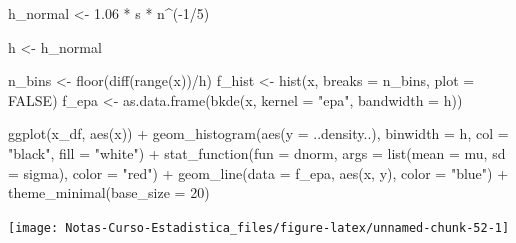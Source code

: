 \documentclass[
  12pt,
]{book}
\newenvironment{Shaded}{\begin{snugshade}}{\end{snugshade}}
\newcommand{\AttributeTok}[1]{\textcolor[rgb]{0.77,0.63,0.00}{#1}}
\newcommand{\ConstantTok}[1]{\textcolor[rgb]{0.00,0.00,0.00}{#1}}
\newcommand{\DecValTok}[1]{\textcolor[rgb]{0.00,0.00,0.81}{#1}}
\newcommand{\FloatTok}[1]{\textcolor[rgb]{0.00,0.00,0.81}{#1}}
\newcommand{\FunctionTok}[1]{\textcolor[rgb]{0.00,0.00,0.00}{#1}}
\newcommand{\NormalTok}[1]{#1}
\newcommand{\OtherTok}[1]{\textcolor[rgb]{0.56,0.35,0.01}{#1}}
\newcommand{\SpecialCharTok}[1]{\textcolor[rgb]{0.00,0.00,0.00}{#1}}
\newcommand{\StringTok}[1]{\textcolor[rgb]{0.31,0.60,0.02}{#1}}
\begin{document}
\begin{Shaded}
\begin{Highlighting}[]
\NormalTok{h\_normal }\OtherTok{\textless{}{-}} \FloatTok{1.06} \SpecialCharTok{*}\NormalTok{ s }\SpecialCharTok{*}\NormalTok{ n}\SpecialCharTok{\^{}}\NormalTok{(}\SpecialCharTok{{-}}\DecValTok{1}\SpecialCharTok{/}\DecValTok{5}\NormalTok{)}

\NormalTok{h }\OtherTok{\textless{}{-}}\NormalTok{ h\_normal}

\NormalTok{n\_bins }\OtherTok{\textless{}{-}} \FunctionTok{floor}\NormalTok{(}\FunctionTok{diff}\NormalTok{(}\FunctionTok{range}\NormalTok{(x))}\SpecialCharTok{/}\NormalTok{h)}
\NormalTok{f\_hist }\OtherTok{\textless{}{-}} \FunctionTok{hist}\NormalTok{(x, }\AttributeTok{breaks =}\NormalTok{ n\_bins, }\AttributeTok{plot =} \ConstantTok{FALSE}\NormalTok{)}
\NormalTok{f\_epa }\OtherTok{\textless{}{-}} \FunctionTok{as.data.frame}\NormalTok{(}\FunctionTok{bkde}\NormalTok{(x, }\AttributeTok{kernel =} \StringTok{"epa"}\NormalTok{, }\AttributeTok{bandwidth =}\NormalTok{ h))}

\FunctionTok{ggplot}\NormalTok{(x\_df, }\FunctionTok{aes}\NormalTok{(x)) }\SpecialCharTok{+} \FunctionTok{geom\_histogram}\NormalTok{(}\FunctionTok{aes}\NormalTok{(}\AttributeTok{y =}\NormalTok{ ..density..),}
    \AttributeTok{binwidth =}\NormalTok{ h, }\AttributeTok{col =} \StringTok{"black"}\NormalTok{, }\AttributeTok{fill =} \StringTok{"white"}\NormalTok{) }\SpecialCharTok{+}
    \FunctionTok{stat\_function}\NormalTok{(}\AttributeTok{fun =}\NormalTok{ dnorm, }\AttributeTok{args =} \FunctionTok{list}\NormalTok{(}\AttributeTok{mean =}\NormalTok{ mu,}
        \AttributeTok{sd =}\NormalTok{ sigma), }\AttributeTok{color =} \StringTok{"red"}\NormalTok{) }\SpecialCharTok{+} \FunctionTok{geom\_line}\NormalTok{(}\AttributeTok{data =}\NormalTok{ f\_epa,}
    \FunctionTok{aes}\NormalTok{(x, y), }\AttributeTok{color =} \StringTok{"blue"}\NormalTok{) }\SpecialCharTok{+} \FunctionTok{theme\_minimal}\NormalTok{(}\AttributeTok{base\_size =} \DecValTok{20}\NormalTok{)}
\end{Highlighting}
\end{Shaded}

\begin{center}\texttt{[image: Notas-Curso-Estadistica\_files/figure-latex/unnamed-chunk-52-1]} \end{center}
\end{document}
